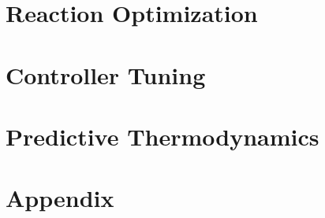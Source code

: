 \documentclass[ twoside,openright,titlepage,numbers=noenddot,headinclude,%
                footinclude=true,cleardoublepage=empty,abstractoff, %
                BCOR=5mm,paper=a4,fontsize=11pt,%
                american,%
                ]{scrreprt}
\begin{document}
\frenchspacing
\raggedbottom
{} %
\pagestyle{plain}



\cleardoublepage
\cleardoublepage

\cleardoublepage
\cleardoublepage
\pagestyle{scrheadings}
\cleardoublepage
\cleardoublepage{}
\cleardoublepage




\part{Reaction Optimization}




\part{Controller Tuning} 



\part{Predictive Thermodynamics}





\appendix
\cleardoublepage
\part{Appendix}


\cleardoublepage

\cleardoublepage

\end{document}
